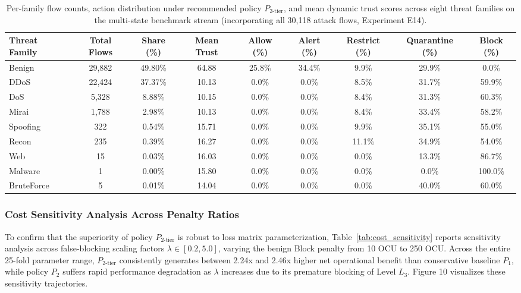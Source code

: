 \documentclass[journal,10pt,onecolumn]{IEEEtran}
\begin{document}
\begin{table}[t]
\caption{Per-family flow counts, action distribution under recommended policy $P_{2\text{-tier}}$, and mean dynamic trust scores across eight threat families on the multi-state benchmark stream (incorporating all 30,118 attack flows, Experiment E14).}
\label{tab:per_family}
\centering
\small
\begin{tabular}{lcccccccc}
\toprule
\textbf{Threat Family} & \textbf{Total Flows} & \textbf{Share (\%)} & \textbf{Mean Trust} & \textbf{Allow (\%)} & \textbf{Alert (\%)} & \textbf{Restrict (\%)} & \textbf{Quarantine (\%)} & \textbf{Block (\%)} \\
\midrule
Benign & 29,882 & 49.80\% & 64.88 & 25.8\% & 34.4\% & 9.9\% & 29.9\% & 0.0\% \\
DDoS & 22,424 & 37.37\% & 10.13 & 0.0\% & 0.0\% & 8.5\% & 31.7\% & 59.9\% \\
DoS & 5,328 & 8.88\% & 10.15 & 0.0\% & 0.0\% & 8.4\% & 31.3\% & 60.3\% \\
Mirai & 1,788 & 2.98\% & 10.13 & 0.0\% & 0.0\% & 8.4\% & 33.4\% & 58.2\% \\
Spoofing & 322 & 0.54\% & 15.71 & 0.0\% & 0.0\% & 9.9\% & 35.1\% & 55.0\% \\
Recon & 235 & 0.39\% & 16.27 & 0.0\% & 0.0\% & 11.1\% & 34.9\% & 54.0\% \\
Web & 15 & 0.03\% & 16.03 & 0.0\% & 0.0\% & 0.0\% & 13.3\% & 86.7\% \\
Malware & 1 & 0.00\% & 15.80 & 0.0\% & 0.0\% & 0.0\% & 0.0\% & 100.0\% \\
BruteForce & 5 & 0.01\% & 14.04 & 0.0\% & 0.0\% & 0.0\% & 40.0\% & 60.0\% \\
\bottomrule
\end{tabular}
\end{table}

\subsubsection{Cost Sensitivity Analysis Across Penalty Ratios}
To confirm that the superiority of policy $P_{2\text{-tier}}$ is robust to loss matrix parameterization, Table~\ref{tab:cost_sensitivity} reports sensitivity analysis across false-blocking scaling factors $\lambda \in [0.2, 5.0]$, varying the benign Block penalty from 10 OCU to 250 OCU. Across the entire 25-fold parameter range, $P_{2\text{-tier}}$ consistently generates between 2.24x and 2.46x higher net operational benefit than conservative baseline $P_1$, while policy $P_2$ suffers rapid performance degradation as $\lambda$ increases due to its premature blocking of Level $L_3$. Figure 10 visualizes these sensitivity trajectories.
\end{document}
